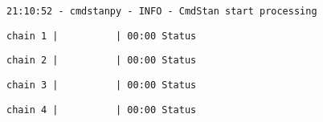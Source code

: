 \documentclass[11pt]{article}
\begin{document}
    \begin{Verbatim}[commandchars=\\\{\}]
21:10:52 - cmdstanpy - INFO - CmdStan start processing
    \end{Verbatim}

    
    \begin{Verbatim}[commandchars=\\\{\}]
chain 1 |          | 00:00 Status
    \end{Verbatim}

    
    
    \begin{Verbatim}[commandchars=\\\{\}]
chain 2 |          | 00:00 Status
    \end{Verbatim}

    
    
    \begin{Verbatim}[commandchars=\\\{\}]
chain 3 |          | 00:00 Status
    \end{Verbatim}

    
    
    \begin{Verbatim}[commandchars=\\\{\}]
chain 4 |          | 00:00 Status
    \end{Verbatim}

    
    \begin{Verbatim}[commandchars=\\\{\}]

    \end{Verbatim}
\end{document}
